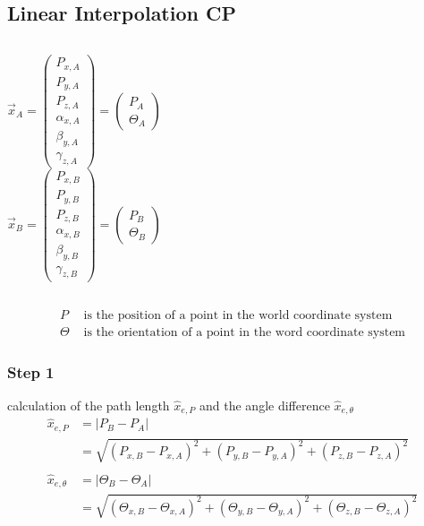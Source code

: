 \documentclass[%
  professionalfonts,%
  xcolor={%
    usenames,%
    dvipsnames,%
    svgnames,%
    table,%
    hyperref%
  }%
]{beamer}
\begin{document}
\subsection{Linear Interpolation CP}
\begin{frame}
\begin{columns}
  \begin{equation*}
  \vec{x}_A = \left( \begin{array}{c} P_{x,A}\\ P_{y,A}\\ P_{z,A}\\ \hline \alpha_{x,A}\\ \beta_{y,A}\\ \gamma_{z,A} \end{array}\right) = \left( \begin{array}{c} P_{A}\\\hline\Theta_{A} \end{array}\right)
  \end{equation*}
  \begin{equation*}
  \vec{x}_B = \left( \begin{array}{c} P_{x,B}\\ P_{y,B}\\ P_{z,B}\\ \hline \alpha_{x,B}\\ \beta_{y,B}\\ \gamma_{z,B} \end{array}\right) = \left( \begin{array}{c} P_{B}\\\hline\Theta_{B} \end{array}\right)
  \end{equation*}
\end{columns}
\begin{align*}
P & \text{ is the position of a point in the world coordinate system} \\
\Theta & \text{ is the orientation of a point in the word coordinate system}   
\end{align*}
\end{frame}

\subsubsection{Step 1}
\begin{frame}
calculation of the path length $\hat{x}_{e,P}$ and the angle difference $\hat{x}_{e,\theta}$
\begin{align*}
\hat{x}_{e,P} & = \left|P_{B} - P_{A}\right|\\
& = \sqrt{(P_{x,B} - P_{x,A})^2 + (P_{y,B} - P_{y,A})^2 + (P_{z,B} - P_{z,A})^2 }\\
\\
\hat{x}_{e,\theta} & = \left|\Theta_{B} - \Theta_{A}\right|\\
& = \sqrt{(\Theta_{x,B} - \Theta_{x,A})^2 + (\Theta_{y,B} - \Theta_{y,A})^2 + (\Theta_{z,B} - \Theta_{z,A})^2 }
\end{align*}
\end{frame}
\end{document}
